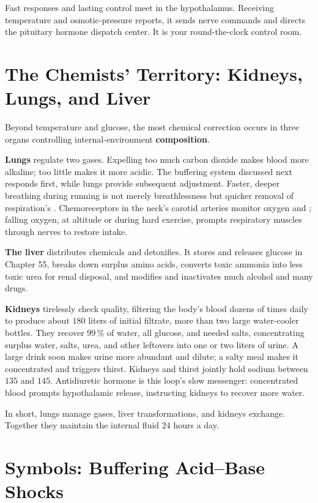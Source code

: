 Fast responses and lasting control meet in the hypothalamus. Receiving temperature and osmotic-pressure reports, it sends nerve commands and directs the pituitary hormone dispatch center. It is your round-the-clock control room.

\section{The Chemists' Territory: Kidneys, Lungs, and Liver}

Beyond temperature and glucose, the most chemical correction occurs in three organs controlling internal-environment \textbf{composition}.

\textbf{Lungs} regulate two gases. Expelling too much carbon dioxide makes blood more alkaline; too little makes it more acidic. The buffering system discussed next responds first, while lungs provide subsequent adjustment. Faster, deeper breathing during running is not merely breathlessness but quicker removal of respiration's . Chemoreceptors in the neck's carotid arteries monitor oxygen and ; falling oxygen, at altitude or during hard exercise, prompts respiratory muscles through nerves to restore intake.

\textbf{The liver} distributes chemicals and detoxifies. It stores and releases glucose in Chapter 55, breaks down surplus amino acids, converts toxic ammonia into less toxic urea for renal disposal, and modifies and inactivates much alcohol and many drugs.

\textbf{Kidneys} tirelessly check quality, filtering the body's blood dozens of times daily to produce about $180$ liters of initial filtrate, more than two large water-cooler bottles. They recover $99\,\%$ of water, all glucose, and needed salts, concentrating surplus water, salts, urea, and other leftovers into one or two liters of urine. A large drink soon makes urine more abundant and dilute; a salty meal makes it concentrated and triggers thirst. Kidneys and thirst jointly hold sodium between $135$ and $145$. Antidiuretic hormone is this loop's slow messenger: concentrated blood prompts hypothalamic release, instructing kidneys to recover more water.

In short, lungs manage gases, liver transformations, and kidneys exchange. Together they maintain the internal fluid $24$ hours a day.

\section{Symbols: Buffering Acid--Base Shocks}

